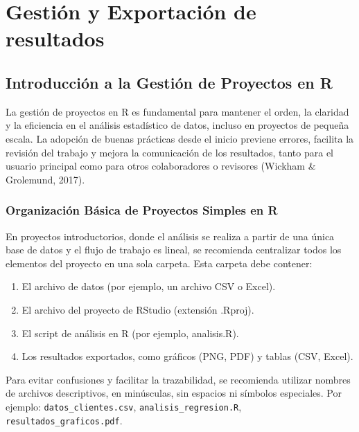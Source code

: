 \documentclass[
  spanish,
  a4paper,
  DIV=11,
  numbers=noendperiod,
  onepage,
  openany]{scrreprt}
\begin{document}
\part{Gestión y Exportación de resultados}


\chapter{Introducción a la Gestión de Proyectos en
R}\label{introducciuxf3n-a-la-gestiuxf3n-de-proyectos-en-r}

La gestión de proyectos en R es fundamental para mantener el orden, la
claridad y la eficiencia en el análisis estadístico de datos, incluso en
proyectos de pequeña escala. La adopción de buenas prácticas desde el
inicio previene errores, facilita la revisión del trabajo y mejora la
comunicación de los resultados, tanto para el usuario principal como
para otros colaboradores o revisores (Wickham \& Grolemund, 2017).

\section{Organización Básica de Proyectos Simples en
R}\label{organizaciuxf3n-buxe1sica-de-proyectos-simples-en-r}

En proyectos introductorios, donde el análisis se realiza a partir de
una única base de datos y el flujo de trabajo es lineal, se recomienda
centralizar todos los elementos del proyecto en una sola carpeta. Esta
carpeta debe contener:

\begin{enumerate}
\def\labelenumi{\arabic{enumi}.}
\item
  El archivo de datos (por ejemplo, un archivo CSV o Excel).
\item
  El archivo del proyecto de RStudio (extensión .Rproj).
\item
  El script de análisis en R (por ejemplo, analisis.R).
\item
  Los resultados exportados, como gráficos (PNG, PDF) y tablas (CSV,
  Excel).
\end{enumerate}

Para evitar confusiones y facilitar la trazabilidad, se recomienda
utilizar nombres de archivos descriptivos, en minúsculas, sin espacios
ni símbolos especiales. Por ejemplo: \texttt{datos\_clientes.csv},
\texttt{analisis\_regresion.R}, \texttt{resultados\_graficos.pdf}.
\end{document}
